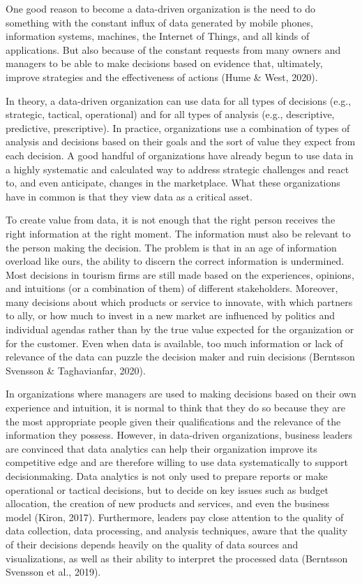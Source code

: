 \documentclass[
  letterpaper,
  DIV=11,
  numbers=noendperiod]{scrreprt}
\begin{document}
One good reason to become a data-driven organization is the need to do
something with the constant influx of data generated by mobile phones,
information systems, machines, the Internet of Things, and all kinds of
applications. But also because of the constant requests from many owners
and managers to be able to make decisions based on evidence that,
ultimately, improve strategies and the effectiveness of actions (Hume \&
West, 2020).

In theory, a data-driven organization can use data for all types of
decisions (e.g., strategic, tactical, operational) and for all types of
analysis (e.g., descriptive, predictive, prescriptive). In practice,
organizations use a combination of types of analysis and decisions based
on their goals and the sort of value they expect from each decision. A
good handful of organizations have already begun to use data in a highly
systematic and calculated way to address strategic challenges and react
to, and even anticipate, changes in the marketplace. What these
organizations have in common is that they view data as a critical asset.

To create value from data, it is not enough that the right person
receives the right information at the right moment. The information must
also be relevant to the person making the decision. The problem is that
in an age of information overload like ours, the ability to discern the
correct information is undermined. Most decisions in tourism firms are
still made based on the experiences, opinions, and intuitions (or a
combination of them) of different stakeholders. Moreover, many decisions
about which products or service to innovate, with which partners to
ally, or how much to invest in a new market are influenced by politics
and individual agendas rather than by the true value expected for the
organization or for the customer. Even when data is available, too much
information or lack of relevance of the data can puzzle the decision
maker and ruin decisions (Berntsson Svensson \& Taghavianfar, 2020).

In organizations where managers are used to making decisions based on
their own experience and intuition, it is normal to think that they do
so because they are the most appropriate people given their
qualifications and the relevance of the information they possess.
However, in data-driven organizations, business leaders are convinced
that data analytics can help their organization improve its competitive
edge and are therefore willing to use data systematically to support
decisionmaking. Data analytics is not only used to prepare reports or
make operational or tactical decisions, but to decide on key issues such
as budget allocation, the creation of new products and services, and
even the business model (Kiron, 2017). Furthermore, leaders pay close
attention to the quality of data collection, data processing, and
analysis techniques, aware that the quality of their decisions depends
heavily on the quality of data sources and visualizations, as well as
their ability to interpret the processed data (Berntsson Svensson et
al., 2019).
\end{document}
